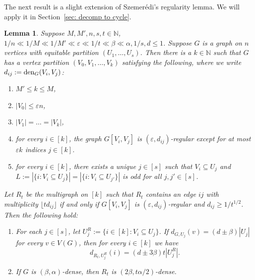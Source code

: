 \documentclass[a4paper, 11pt, reqno]{amsart}
\newtheorem{lemma}[definition]{Lemma}
\numberwithin{equation}{section}
\newcommand{\1}{{\rm 1\hspace*{-0.4ex}%
\rule{0.1ex}{1.52ex}\hspace*{0.2ex}}}
\newcommand{\N}{\mathbb N}
\newcommand{\den}{{\rm den}}
\renewcommand{\epsilon}{\varepsilon}
\newcommand{\sub}{\subseteq}
\begin{document}
The next result is a slight extension of Szemer\'edi's regularity lemma. We will apply it in Section~\ref{sec: decomp to cycle}.

\begin{lemma}\label{lem: rl}
Suppose $M,M',n,s,t \in \N$, $1/n \ll 1/M \ll 1/M'\ll \epsilon\ll 1/t\ll \beta \ll \alpha,1/s,d\leq 1$.
Suppose $G$ is a graph on $n$ vertices with equitable partition $(U_1,\dots, U_s)$. 
Then there is a $k\in \N$ such that $G$ has a vertex partition $(V_0,V_1,\ldots,V_k)$ satisfying the following,
where we write $d_{ij}:=\den_G(V_i,V_j)$:
\begin{enumerate}[label=(\Roman*)]
	\item $M'\leq k \leq M$,
	\item $|V_0|\leq \epsilon n$,
	\item $|V_1|=\ldots=|V_k|$, 
	\item for every $i \in [k]$, the graph $G[V_i,V_j]$ is $(\epsilon,d_{ij})$-regular except for at most $\epsilon k$ indices $j\in[k]$.  
	\item for every $i\in [k]$, there exists a unique $j \in [s]$ such that $V_i\subseteq U_j$
	and $L:=|\{i:V_i \sub U_j\}|=|\{i:V_i \sub U_{j'}\}|$ is odd for all $j,j'\in [s]$.
\end{enumerate}
Let $R_t$ be the multigraph on $[k]$ such that $R_t$ contains an edge $ij$ with multiplicity $\lfloor t d_{ij} \rfloor$ 
if and only if $G[V_i,V_j]$ is $(\epsilon,d_{ij})$-regular and $d_{ij}\geq 1/t^{1/2}$. 
Then the following hold:
\begin{enumerate}
\item[(VI)] For each $j\in [s]$, let $U_j^R:=\{i\in [k]:V_i\sub U_j\}$.
If $d_{G, U_j}(v) = (d\pm \beta) |U_j|$ for every $v\in V(G)$, 
then for every $i\in [k]$ we have $$d_{R_t,U_j^R}(i)= (d\pm 3\beta )t|U^R_j|.$$
\item[(VII)] If $G$ is $(\beta,\alpha)$-dense, then $R_t$ is $(2\beta, t\alpha/2)$-dense.
\end{enumerate}
\end{lemma}
\end{document}
